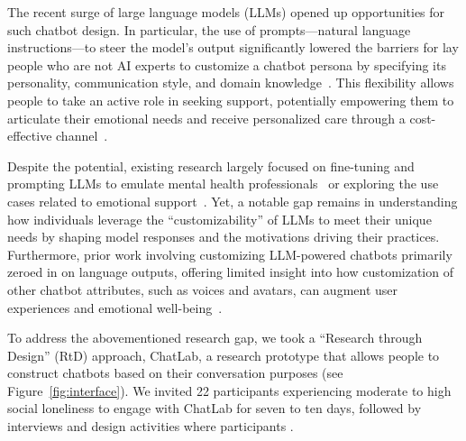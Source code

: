 The recent surge of large language models (LLMs) opened up opportunities for such chatbot design. In particular, the use of prompts---natural language instructions---to steer the model's output significantly lowered the barriers for lay people who are not AI experts to customize a chatbot persona by specifying its personality, communication style, and domain knowledge~\cite{pengfei_2023_prompt, Ha2024Clochat, characterai}. This flexibility allows people to take an active role in seeking support, potentially empowering them to articulate their emotional needs and receive personalized care through a cost-effective channel~\cite{song2024typingcure, li4875898human}.

Despite the potential, existing research largely focused on fine-tuning and prompting LLMs to emulate mental health professionals~\cite{wu2024sunnie, liu2023chatcounselor, chen2023llm} or exploring the use cases related to emotional support~\cite{song2024typingcure, li4875898human, jo2023understanding, Ha2024Clochat}. Yet, a notable gap remains in understanding how individuals leverage the ``customizability'' of LLMs to meet their unique needs by shaping model responses and the motivations driving their practices. Furthermore, prior work involving customizing LLM-powered chatbots primarily zeroed in on language outputs, offering limited insight into how customization of other chatbot attributes, such as voices and avatars, can augment user experiences and emotional well-being~\cite{Feine2019Taxonomy, deSouza2022Design}.

To address the abovementioned research gap, we took a ``Research through Design'' (RtD) approach,  ChatLab, a research prototype that allows people to construct  chatbots based on their conversation purposes (see Figure~\ref{fig:interface}).  We invited 22 participants experiencing moderate to high social loneliness to engage with ChatLab for seven to ten days, followed by interviews and design activities where participants .


